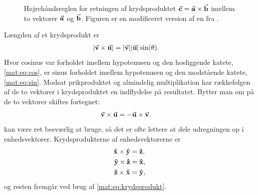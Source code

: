 \begin{figure}[]
    \centering
    \caption{Højrehåndsreglen for retningen af krydsproduktet $\va{c} = \va{a} \times \va{b}$ imellem to vektorer $\va{a}$ og $\va{b}$. Figuren er en modificeret version af en fra \cite{RighthandRuleWikipedia}.}
    \label{mat:fig:right_hand_rule_mat}
\end{figure}
%
Længden af et krydsprodukt er
%
\begin{align}
    \abs{\va v \times \va u} &= \abs{\va v}\abs{\va u}\sin(\theta).
\end{align}
%
Hvor cosinus var forholdet imellem hypotenusen og den hosliggende katete, \cref{mat:eq:cos}, er sinus forholdet imellem hypotenusen og den modstående katete, \cref{mat:eq:sin}.
Modsat prikproduktet og almindelig multiplikation har rækkefølgen af de to vektorer i krydsproduktet en indflydelse på resultatet. Bytter man om på de to vektorer skiftes fortegnet:
%
\begin{align}
    \va v \times \va u &= -\va u\times \va v. \label{mat:eq:krydskommutator}
\end{align}
%
 kan være ret besværlig at bruge, så det er ofte lettere at dele udregningen op i enhedsvektorer. Krydsprodukterne af enhedsvektorerne er
%
\begin{subequations}
\begin{align}
    \vu{x} \times \vu{y} &= \vu{z}, \\
    \vu{y} \times \vu{z} &= \vu{x}, \\
    \vu{z} \times \vu{x} &= \vu{y},
\end{align}
\end{subequations}
%
og resten fremgår ved brug af \cref{mat:eq:krydsprodukt}.
